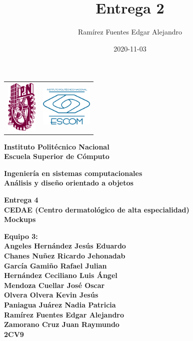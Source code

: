 \documentclass[12pt,letterpaper]{article}
\author{Ram\'irez Fuentes Edgar Alejandro}
\title{Entrega 2}
\date {2020-11-03}
\begin{document}
	\pagestyle{plain}
	{

		{
			\begin{tabular}
				{
					p{} 
					p{} 
				}
				\includegraphics[width=1.5cm, height=2.5cm]{ipn.png} &  
				\includegraphics[width=2.5cm, height=2cm]{escom.png}
			\end{tabular}
		}

		\begin{center}

			\par\vspace{1cm} %
			{
				\Huge\textbf
				{
					Instituto Polit\'ecnico Nacional 
					\\[.2cm]Escuela Superior de C\'omputo
				}
			}

			\par\vspace{0.5cm}
			{
				\large\textbf
				{
					Ingenier\'ia en sistemas computacionales 
					\\[.5cm]An\'alisis y diseño orientado a objetos
				}
			}

			\vfill

			\par\vspace{0.7cm}
			{
				\textbf
				{
					Entrega 4 \\
                    CEDAE (Centro dermatológico de alta especialidad) \\
                    Mockups
				}
			}

			\vfill

			\par\vspace{0.7cm}
			{
				\textbf
				{
                    Equipo 3:
                    \\Angeles Hernández Jesús Eduardo
                    \\Chanes Nuñez Ricardo Jehonadab
                    \\García Gamiño Rafael Julian
                    \\Hernández Ceciliano Luis Ángel
                    \\Mendoza Cuellar José Oscar
                    \\Olvera Olvera Kevin Jesús
                    \\Paniagua Juárez Nadia Patricia
                    \\Ramírez Fuentes Edgar Alejandro
                    \\Zamorano Cruz Juan Raymundo
					\\2CV9
				} 
			}


\end{center}}
\end{document}
